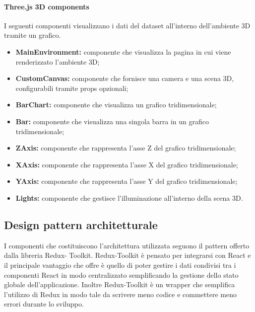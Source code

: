 \paragraph{Three.js 3D components}
    I seguenti componenti visualizzano i dati del dataset all'interno dell'ambiente 3D tramite un grafico.
    \begin{itemize}
        \item \textbf{MainEnvironment:} componente che visualizza la pagina in cui viene renderizzato l'ambiente 3D;
        \item \textbf{CustomCanvas:} componente che fornisce una camera e una scena 3D, configurabili tramite props opzionali;
        \item \textbf{BarChart:} componente che visualizza un grafico tridimensionale;
        \item \textbf{Bar:} componente che visualizza una singola barra in un grafico tridimensionale;
        \item \textbf{ZAxis:} componente che rappresenta l'asse Z del grafico tridimensionale;
        \item \textbf{XAxis:} componente che rappresenta l'asse X del grafico tridimensionale;
        \item \textbf{YAxis:} componente che rappresenta l'asse Y del grafico tridimensionale;
        \item \textbf{Lights:} componente che gestisce l'illuminazione all'interno della scena 3D.
    \end{itemize}

\subsection{Design pattern architetturale}
I componenti che costituiscono l’architettura utilizzata seguono il pattern offerto dalla libreria Redux-
Toolkit.
Redux-Toolkit è pensato per integrarsi con React e il principale vantaggio che offre è quello di poter
gestire i dati condivisi tra i componenti React in modo centralizzato semplificando la gestione dello stato
globale dell’applicazione.
Inoltre Redux-Toolkit è un wrapper che semplifica l'utilizzo di Redux in modo tale da scrivere meno codice e commettere meno errori durante lo sviluppo.

